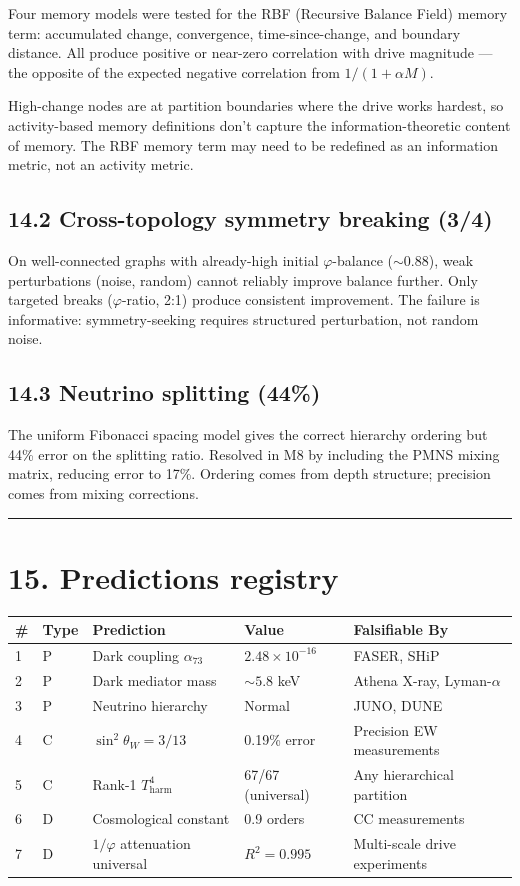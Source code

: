 \documentclass[11pt,a4paper]{article}
\begin{document}
Four memory models were tested for the RBF (Recursive Balance Field) memory term: accumulated change, convergence, time-since-change, and boundary distance. All produce positive or near-zero correlation with drive magnitude — the opposite of the expected negative correlation from $1/(1 + \alpha M)$.

High-change nodes are at partition boundaries where the drive works hardest, so activity-based memory definitions don't capture the information-theoretic content of memory. The RBF memory term may need to be redefined as an information metric, not an activity metric.

\subsection*{14.2 Cross-topology symmetry breaking (3/4)}

On well-connected graphs with already-high initial $\varphi$-balance ($\sim 0.88$), weak perturbations (noise, random) cannot reliably improve balance further. Only targeted breaks ($\varphi$-ratio, 2:1) produce consistent improvement. The failure is informative: symmetry-seeking requires structured perturbation, not random noise.

\subsection*{14.3 Neutrino splitting (44\%)}

The uniform Fibonacci spacing model gives the correct hierarchy ordering but 44\% error on the splitting ratio. Resolved in M8 by including the PMNS mixing matrix, reducing error to 17\%. Ordering comes from depth structure; precision comes from mixing corrections.

\begin{center}\rule{0.5\linewidth}{0.4pt}\end{center}

\section*{15. Predictions registry}

\begin{longtable}[]{@{}lllll@{}}
\toprule
\# & Type & Prediction & Value & Falsifiable By \\
\midrule\endhead
1 & P & Dark coupling $\alpha_{73}$ & $2.48 \times 10^{-16}$ & FASER, SHiP \\
2 & P & Dark mediator mass & $\sim 5.8$ keV & Athena X-ray, Lyman-$\alpha$ \\
3 & P & Neutrino hierarchy & Normal & JUNO, DUNE \\
4 & C & $\sin^2\theta_W = 3/13$ & 0.19\% error & Precision EW measurements \\
5 & C & Rank-1 $T_{\text{harm}}^4$ & 67/67 (universal) & Any hierarchical partition \\
6 & D & Cosmological constant & 0.9 orders & CC measurements \\
7 & D & $1/\varphi$ attenuation universal & $R^2 = 0.995$ & Multi-scale drive experiments \\
\bottomrule
\end{longtable}
\end{document}
